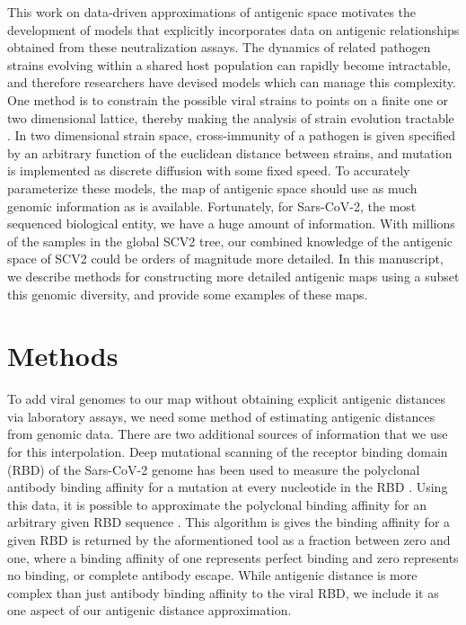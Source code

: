 \documentclass{article}
\begin{document}
This work on data-driven approximations of antigenic space motivates the development of models that explicitly incorporates data on antigenic relationships obtained from these neutralization assays.
The dynamics of related pathogen strains evolving within a shared host population can rapidly become intractable, and therefore researchers have devised models which can manage this complexity.
One method is to constrain the possible viral strains to points on a finite one or two dimensional lattice, thereby making the analysis of strain evolution tractable \cite{gogDynamicsSelectionManystrain2002} . 
In two dimensional strain space, cross-immunity of a pathogen is given specified by an arbitrary function of the euclidean distance between strains, and mutation is implemented as discrete diffusion with some fixed speed. 
To accurately parameterize these models, the map of antigenic space should use as much genomic information as is available.
Fortunately, for Sars-CoV-2, the most sequenced biological entity, we have a huge amount of information. 
With millions of the samples in the global SCV2 tree, our combined knowledge of the antigenic space of SCV2 could be orders of magnitude more detailed.
In this manuscript, we describe methods for constructing more detailed antigenic maps using a subset this genomic diversity, and provide some examples of these maps.



\section{Methods}

To add viral genomes to our map without obtaining explicit antigenic distances via laboratory assays, we need some method of estimating antigenic distances from genomic data. 
There are two additional sources of information that we use for this interpolation.
Deep mutational scanning of the receptor binding domain (RBD) of the Sars-CoV-2 genome has been used to measure the polyclonal antibody binding affinity for a mutation at every nucleotide in the RBD \cite{starr2020deep}.
Using this data, it is possible to approximate the polyclonal binding affinity for an arbitrary given RBD sequence \cite{greaney2022antibody}.
This algorithm is gives the binding affinity for a given RBD is returned by the aformentioned tool as a fraction between zero and one, where a binding affinity of one represents perfect binding and zero represents no binding, or complete antibody escape.
While antigenic distance is more complex than just antibody binding affinity to the viral RBD, we include it as one aspect of our antigenic distance approximation. 
\end{document}
